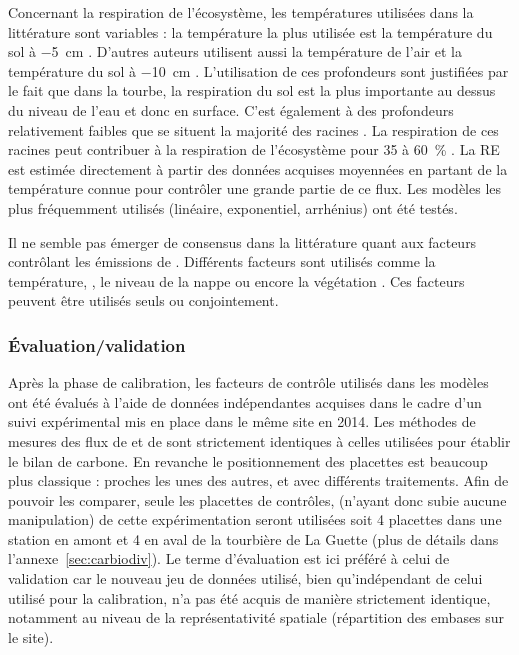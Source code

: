 Concernant la respiration de l'écosystème, les températures utilisées dans la littérature sont variables : la température la plus utilisée est la température du sol à \SI{-5}{\centi\metre}  \citep{ballantyne2014}.
D'autres auteurs utilisent aussi la température de l'air et la température du sol à \SI{-10}{\centi\metre} \citep{bortoluzzi2006a,kim1992}.
L'utilisation de ces profondeurs sont justifiées par le fait que dans la tourbe, la respiration du sol est la plus importante au dessus du niveau de l'eau et donc en surface.
\plop %
C'est également à des profondeurs relativement faibles que se situent la majorité des racines \plop.
La respiration de ces racines peut contribuer à la respiration de l'écosystème pour 35 à \SI{60}{\percent} \citep{silvola1996,crow2005}.
La RE est estimée directement à partir des données acquises moyennées en partant de la température connue pour contrôler une grande partie de ce flux.
Les modèles les plus fréquemment utilisés (linéaire, exponentiel, arrhénius) ont été testés.

Il ne semble pas émerger de consensus dans la littérature quant aux facteurs contrôlant les émissions de \chh.
Différents facteurs sont utilisés comme la température, \citep{alm1999,bubier1995b}, le niveau de la nappe \citep{bubier1993} ou encore la végétation \citep{bortoluzzi2006a}.
Ces facteurs peuvent être utilisés seuls ou conjointement.

\subsubsection{Évaluation/validation}

Après la phase de calibration, les facteurs de contrôle utilisés dans les modèles ont été évalués à l'aide de données indépendantes acquises dans le cadre d'un suivi expérimental mis en place dans le même site en 2014.
Les méthodes de mesures des flux de \coo et de \chh sont strictement identiques à celles utilisées pour établir le bilan de carbone.
En revanche le positionnement des placettes est beaucoup plus classique : proches les unes des autres, et avec différents traitements.
Afin de pouvoir les comparer, seule les placettes de contrôles, (n'ayant donc subie aucune manipulation) de cette expérimentation seront utilisées soit 4 placettes dans une station en amont et 4 en aval de la tourbière de La Guette (plus de détails dans l'annexe~\ref{sec:carbiodiv}).
Le terme d'évaluation est ici préféré à celui de validation car le nouveau jeu de données utilisé, bien qu'indépendant de celui utilisé pour la calibration, n'a pas été acquis de manière strictement identique, notamment au niveau de la représentativité spatiale (répartition des embases sur le site).

